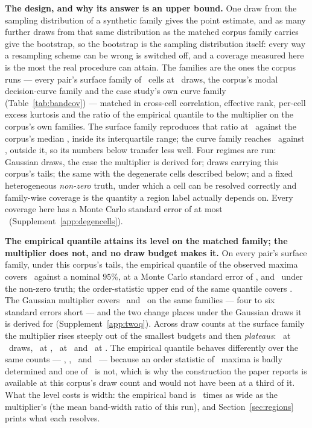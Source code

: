 \documentclass[11pt,3p,review,authoryear]{elsarticle}
\theoremstyle{definition}
\begin{document}
\textbf{The design, and why its answer is an upper bound.} One draw from the
sampling distribution of a synthetic family gives the point estimate, and as
many further draws from that same distribution as the matched corpus family
carries give the bootstrap, so the bootstrap is the sampling distribution
itself: every way a resampling scheme can be wrong is switched off, and a
coverage measured here is the most the real procedure can attain. The
families are the ones the corpus runs --- every pair's surface family of
\nCellsPerPairMedian\ cells at \nDrawsSurface\ draws, the corpus's modal
decision-curve family and the case study's own curve family
(Table~\ref{tab:bandcov}) --- matched in cross-cell correlation, effective
rank, per-cell excess kurtosis and the ratio of the empirical quantile to the
multiplier on the corpus's own families. The surface family reproduces that
ratio at \ratioSynthWhole\ against the corpus's median \ratioCorpusWhole,
inside its interquartile range; the curve family reaches \ratioSynthDca\
against \ratioCorpusDca, outside it, so its numbers below transfer less well.
Four regimes are run: Gaussian draws, the case the multiplier is derived for;
draws carrying this corpus's tails; the same with the degenerate cells
described below; and a fixed heterogeneous \emph{non-zero} truth, under which
a cell can be resolved correctly and family-wise coverage is the quantity a
region label actually depends on. Every coverage here has a Monte Carlo
standard error of at most \bandCoverageSEMax\ (Supplement~\ref{app:degencells}).

\textbf{The empirical quantile attains its level on the matched family; the
multiplier does not, and no draw budget makes it.} On every pair's surface
family, under this corpus's tails, the empirical quantile of the observed
maxima covers \covEmpHeavyWholeAtDesign\ against a nominal $95\%$, at a
Monte Carlo standard error of \covEmpHeavyWholeAtDesignSE, and
\covEmpNonzeroWholeAtDesign\ under the non-zero truth; the order-statistic
upper end of the same quantile covers \covEmpHiHeavyWholeAtDesign. The
Gaussian multiplier covers \covMultHeavyWholeAtDesign\ and
\covMultNonzeroWholeAtDesign\ on the same families --- four to six standard
errors short --- and the two change places under the Gaussian draws it
is derived for (Supplement~\ref{app:twoq}). Across draw counts at the surface
family the multiplier rises steeply out of the smallest budgets and then
\emph{plateaus}: \covMultBootThirtyThree\ at \nBootThirtyThree\ draws,
\covMultBootOneFifty\ at \nBootOneFifty, \covMultBootFourHundred\ at
\nBootFourHundred\ and \covMultBootOneThousand\ at \nBootOneThousand. The
empirical quantile behaves differently over the same counts ---
\covEmpBootThirtyThree, \covEmpBootOneFifty, \covEmpBootFourHundred\ and
\covEmpBootOneThousand\ --- because an order statistic of \nBootThirtyThree\
maxima is badly determined and one of \nDrawsSurface\ is not, which is why
the construction the paper reports is available at this corpus's draw count
and would not have been at a third of it. What the level costs is width: the
empirical band is \widthEmpOverMultAtDesign\ times as wide as the
multiplier's (the mean band-width ratio of this run), and
Section~\ref{sec:regions} prints what each resolves.
\end{document}
